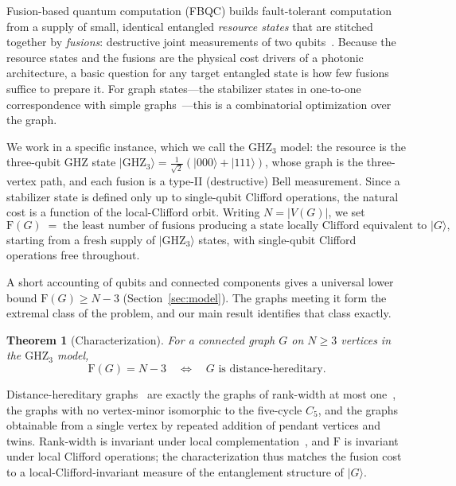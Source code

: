 \documentclass[11pt]{article}
\newtheorem{theorem}{Theorem}
\theoremstyle{definition}
\theoremstyle{remark}
\newcommand{\F}{\mathrm{F}}
\newcommand{\GHZ}{\mathrm{GHZ}_3}
\newcommand{\N}{N}
\begin{document}
Fusion-based quantum computation (FBQC) builds fault-tolerant computation from a supply of small,
identical entangled \emph{resource states} that are stitched together by \emph{fusions}:
destructive joint measurements of two qubits~\cite{fbqc}. Because the resource states and the
fusions are the physical cost drivers of a photonic architecture, a basic question for any target
entangled state is how few fusions suffice to prepare it. For graph states---the stabilizer states
in one-to-one correspondence with simple graphs~\cite{graphstates}---this is a combinatorial
optimization over the graph.

We work in a specific instance, which we call the $\GHZ$ model: the resource is the three-qubit
GHZ state $|\GHZ\rangle=\tfrac{1}{\sqrt2}(|000\rangle+|111\rangle)$, whose graph is the
three-vertex path, and each fusion is a type-II (destructive) Bell measurement. Since a stabilizer
state is defined only up to single-qubit Clifford operations, the natural cost is a function of
the local-Clifford orbit. Writing $\N=|V(G)|$, we set
\[
  \F(G)\;=\;\text{the least number of fusions producing a state locally Clifford equivalent to }|G\rangle,
\]
starting from a fresh supply of $|\GHZ\rangle$ states, with single-qubit Clifford operations free
throughout.

A short accounting of qubits and connected components gives a universal lower bound
$\F(G)\ge \N-3$ (Section~\ref{sec:model}). The graphs meeting it form the extremal class of the
problem, and our main result identifies that class exactly.

\begin{theorem}[Characterization]\label{thm:main}
For a connected graph $G$ on $\N\ge 3$ vertices in the $\GHZ$ model,
\[
  \F(G)=\N-3 \quad\Longleftrightarrow\quad G \text{ is distance-hereditary.}
\]
\end{theorem}

Distance-hereditary graphs~\cite{bandeltmulder,howorka} are exactly the graphs of rank-width at
most one~\cite{oum-rw}, the graphs with no vertex-minor isomorphic to the five-cycle $C_5$, and
the graphs obtainable from a single vertex by repeated addition of pendant vertices and twins.
Rank-width is invariant under local complementation~\cite{oum-rw,bouchet}, and $\F$ is invariant
under local Clifford operations; the characterization thus matches the fusion cost to a
local-Clifford-invariant measure of the entanglement structure of $|G\rangle$.
\end{document}
